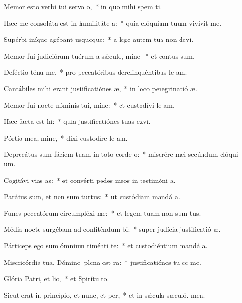 \item Memor esto verbi tui servo o,~* in quo mihi spem ti.
\item Hæc me consoláta est in humilitáte a:~* quia elóquium tuum vivivit me.
\item Supérbi iníque agébant usqueque:~* a lege autem tua non devi.
\item Memor fui judiciórum tuórum a sǽculo, mine:~* et contus sum.
\item Deféctio ténu me,~* pro peccatóribus derelinquéntibus le am.
\item Cantábiles mihi erant justificatiónes æ,~* in loco peregrinatió æ.
\item Memor fui nocte nóminis tui, mine:~* et custodívi le am.
\item Hæc facta est hi:~* quia justificatiónes tuas exvi.
\item Pórtio mea, mine,~* dixi custodíre le am.
\item Deprecátus sum fáciem tuam in toto corde o:~* miserére mei secúndum elóqui um.
\item Cogitávi vias as:~* et convérti pedes meos in testimóni a.
\item Parátus sum, et non sum turtus:~* ut custódiam mandá a.
\item Funes peccatórum circumpléxi  me:~* et legem tuam non sum tus.
\item Média nocte surgébam ad confiténdum bi:~* super judícia justificatió æ.
\item Párticeps ego sum ómnium timénti te:~* et custodiéntium mandá a.
\item Misericórdia tua, Dómine, plena est ra:~* justificatiónes tu ce me.
\item Glória Patri, et lio,~* et Spirítu to.
\item Sicut erat in princípio, et nunc, et per,~* et in sǽcula sæculó. men.
